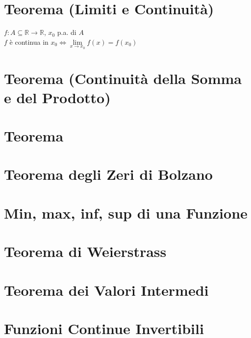\documentclass[a4paper, twoside, italian, 11pt]{book}
\newcommand{\R}{\mathbb{R}}
\begin{document}
\section{Teorema (Limiti e Continuità)}

\noindent
$f : A \subseteq \R \rightarrow \R$, $x_0$ p.a. di $A$ \\

\noindent
$f$ è continua in $x_0 \iff \lim\limits_{x \to x_0} f(x) = f(x_0)$



\section{Teorema (Continuità della Somma e del Prodotto)}




\section{Teorema}




\section{Teorema degli Zeri di Bolzano}




\section{Min, max, inf, sup di una Funzione}




\section{Teorema di Weierstrass}




\section{Teorema dei Valori Intermedi}




\section{Funzioni Continue Invertibili}
\end{document}
